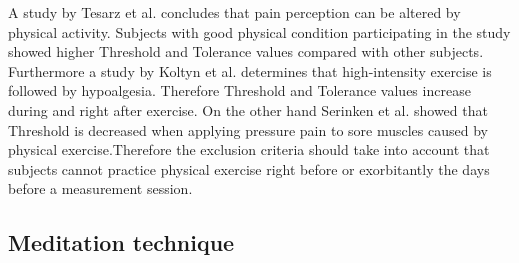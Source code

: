 A study by Tesarz et al. \cite{Tesarz2012} concludes that pain perception can be altered by physical activity. Subjects with good physical condition participating in the study showed higher Threshold and Tolerance values compared with other subjects. %
Furthermore a study by Koltyn et al. \cite{Koltyn2002} determines that high-intensity exercise is followed by hypoalgesia. Therefore Threshold and Tolerance values increase during and right after exercise. On the other hand Serinken et al. \cite{Serinken2013} showed that Threshold is decreased when applying pressure pain to sore muscles caused by physical exercise.Therefore the exclusion criteria should take into account that subjects cannot practice physical exercise right before or exorbitantly the days before a measurement session.



\subsection{Meditation technique}

